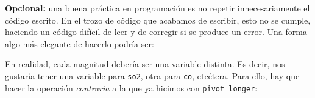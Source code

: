 \documentclass[]{article}
\newenvironment{Shaded}{\begin{snugshade}}{\end{snugshade}}
\newcommand{\DataTypeTok}[1]{\textcolor[rgb]{0.13,0.29,0.53}{#1}}
\newcommand{\DecValTok}[1]{\textcolor[rgb]{0.00,0.00,0.81}{#1}}
\newcommand{\KeywordTok}[1]{\textcolor[rgb]{0.13,0.29,0.53}{\textbf{#1}}}
\newcommand{\NormalTok}[1]{#1}
\newcommand{\OperatorTok}[1]{\textcolor[rgb]{0.81,0.36,0.00}{\textbf{#1}}}
\newcommand{\OtherTok}[1]{\textcolor[rgb]{0.56,0.35,0.01}{#1}}
\newcommand{\StringTok}[1]{\textcolor[rgb]{0.31,0.60,0.02}{#1}}
\begin{document}
\textbf{Opcional:} una buena práctica en programación es no repetir
innecesariamente el código escrito. En el trozo de código que acabamos
de escribir, esto no se cumple, haciendo un código difícil de leer y de
corregir si se produce un error. Una forma algo más elegante de hacerlo
podría ser:

\begin{Shaded}
\end{Shaded}

En realidad, cada magnitud debería ser una variable distinta. Es decir,
nos gustaría tener una variable para \texttt{so2}, otra para
\texttt{co}, etcétera. Para ello, hay que hacer la operación
\emph{contraria} a la que ya hicimos con \texttt{pivot\_longer}:

\begin{Shaded}
\end{Shaded}
\end{document}
